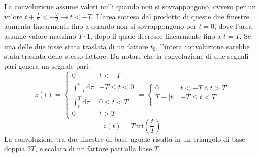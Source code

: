 \documentclass{article}
\newcommand{\tri}{\mathrm{tri}}
\newcommand{\df}{\mathrm{d}}
\begin{document}
La convoluzione assume valori nulli quando non si sovrappongono, ovvero per un valore $t+\displaystyle\frac{T}{2}<-\frac{T}{2}\to t<-T$. L'area sottesa dal prodotto 
di queste due finestre aumenta linearmente fino a quando non si sovrappongono per $t=0$, dove l'area assume valore massimo $T\cdot 1$, dopo il quale 
decresce linearmente fino a $t=T$. Se una delle due fosse stata traslata di un fattore $t_0$, l'intera convoluzione sarebbe stata traslata dello stesso fattore. Da notare 
che la convoluzione di due segnali pari genera un segnale pari.  
\begin{equation*}
    z(t)=\begin{cases}
        0&t<-T\\
        \displaystyle\int_{-T}^t\df\tau&-T\leq t<0\\
        \displaystyle\int_t^T\df\tau&0\leq t<T\\
        0&t>T
    \end{cases}=\begin{cases}
        0&t<-T\land t>T\\
        T-|t|&-T\leq t<T\\
    \end{cases}
\end{equation*}
\begin{equation}
    z(t)=T\,\tri \left(\displaystyle\frac{t}{T}\right)
\end{equation}
La convoluzione tra due finestre di base uguale risulta in un triangolo di base doppia $2T$, e scalata di un fattore pari alla base $T$. 

\begin{center}
\end{center}
\end{document}
